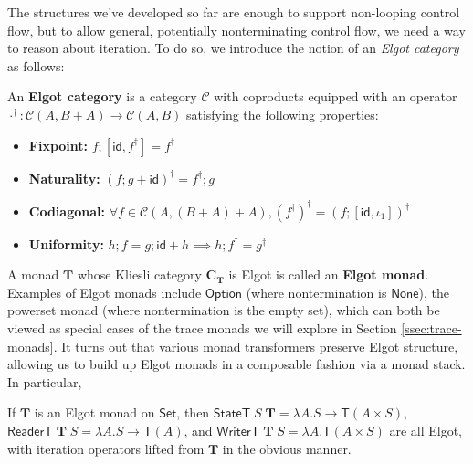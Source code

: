 \documentclass[acmsmall,screen,review]{acmart}
\newcommand{\mc}[1]{\ensuremath{\mathcal{#1}}}
\newcommand{\mb}[1]{\ensuremath{\mathbf{#1}}}
\newcommand{\ms}[1]{\ensuremath{\mathsf{#1}}}
\begin{document}
The structures we've developed so far are enough to support non-looping control
flow, but to allow general, potentially nonterminating control flow, we need a
way to reason about iteration. To do so, we introduce the notion of an
\textit{Elgot category} as follows:
\begin{definition} 
  An \textbf{Elgot category} is a category \(\mc{C}\) with coproducts equipped
  with an operator \(\cdot^\dagger: \mc{C}(A, B + A) \to \mc{C}(A, B)\)
  satisfying the following properties:
  \begin{itemize}
    \item \textbf{Fixpoint:} \(f;[\ms{id}, f^\dagger] = f^\dagger\)
    \item \textbf{Naturality:} \((f;g + \ms{id})^\dagger = f^\dagger;g\)
    \item \textbf{Codiagonal:} \(\forall f \in \mc{C}(A, (B + A) + A), (f^\dagger)^\dagger = (f;[\ms{id}, \iota_1])^\dagger\)
    \item \textbf{Uniformity:}
    \(
      h;f = g;\ms{id} + h \implies h;f^\dagger = g^\dagger
    \)
  \end{itemize}
\end{definition}
A monad \(\mb{T}\) whose Kliesli category \(\mb{C}_{\mb{T}}\) is Elgot is called
an \textbf{Elgot monad}. Examples of Elgot monads include \(\ms{Option}\) (where
nontermination is \(\ms{None}\)), the powerset monad (where nontermination is
the empty set), which can both be viewed as special cases of the trace monads we
will explore in Section \ref{ssec:trace-monads}. It turns out that various monad
transformers preserve Elgot structure, allowing us to build up Elgot monads in a
composable fashion via a monad stack. In particular,
\begin{proposition}
  If \(\mb{T}\) is an Elgot monad on \(\ms{Set}\), then \(\ms{StateT}\;S\;\mb{T}
  = \lambda A. S \to \ms{T}(A \times S)\), \(\ms{ReaderT}\;\mb{T}\;S = \lambda
  A. S \to \ms{T}(A)\), and \(\ms{WriterT}\;\mb{T}\;S = \lambda A. \ms{T}(A
  \times S)\) are all Elgot, with iteration operators lifted from \(\mb{T}\) in
  the obvious manner.
\end{proposition}
\end{document}

